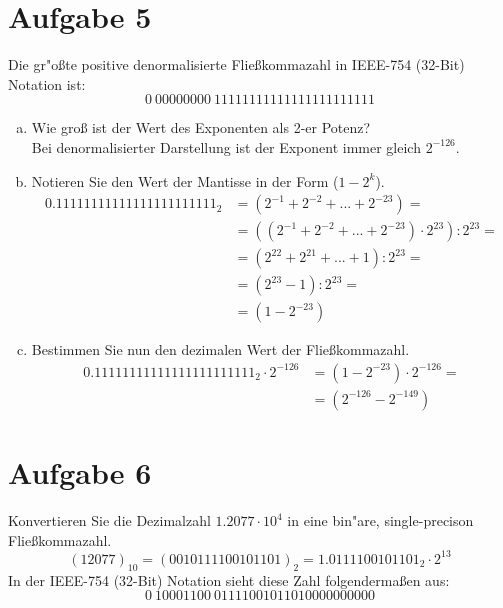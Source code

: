 \documentclass[10pt, oneside]{article}
\begin{document}
\section{Aufgabe 5}

Die gr"o{\ss}te positive denormalisierte Fließkommazahl in IEEE-754 (32-Bit)
Notation ist:
\begin{equation*}
    0\ 00000000\ 11111111111111111111111
\end{equation*}
\begin{enumerate}[(a)]
    \item Wie gro{\ss} ist der Wert des Exponenten als 2-er Potenz? \\
        Bei denormalisierter Darstellung ist der Exponent immer gleich $2^{-126}$.
    \item Notieren Sie den Wert der Mantisse in der Form ($1 - 2^k$).
        \begin{align*}
            0.11111111111111111111111_2 &= (2^{-1} + 2^{-2} + ... + 2^{-23}) = \\
                                        &= ((2^{-1} + 2^{-2} + ... + 2^{-23}) \cdot 2^{23}) : 2^{23} = \\
                                        &= (2^{22} + 2^{21} + ... + 1) : 2^{23} = \\
                                        &= (2^23 - 1) : 2^{23} = \\
                                        &= (1 - 2^{-23})
        \end{align*}
    \item Bestimmen Sie nun den dezimalen Wert der Flie{\ss}kommazahl.
        \begin{align*}
            0.11111111111111111111111_2 \cdot 2^{-126} &= (1 - 2^{-23}) \cdot 2^{-126} = \\
                                                       &= (2^{-126} - 2^{-149})
        \end{align*}
\end{enumerate}

\section{Aufgabe 6}

Konvertieren Sie die Dezimalzahl $1.2077 \cdot 10^4$ in eine bin"are,
single-precison Flie{\ss}kommazahl.
\begin{equation*}
    (12077)_{10} = (0010111100101101)_2 = 1.0111100101101_2 \cdot 2^{13}
\end{equation*}
In der IEEE-754 (32-Bit) Notation sieht diese Zahl folgenderma{\ss}en aus:
\begin{equation*}
    0\ 10001100\ 01111001011010000000000
\end{equation*}
\end{document}

